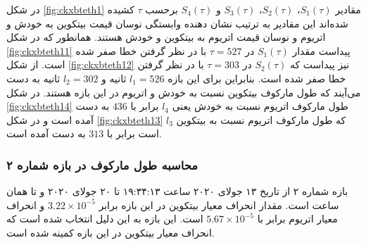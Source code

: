 در شکل \ref{fig:ckxbteth1} مقادیر $S_1( \tau )$، $S_2( \tau )$، $S_3( \tau )$ و $S_4( \tau )$ برحسب $\tau$ 
کشیده شده‌اند این مقادیر به ترتیب نشان دهنده وابستگی نوسان قیمت بیتکوین به خودش و اتریوم و نوسان قیمت اتریوم به بیتکوین و خودش هستند. 
همانطور که در شکل \ref{fig:ckxbteth11} پیداست مقدار $S_1( \tau )$ در $\tau = 527$ با در نظر گرفتن خطا 
صفر شده است. از شکل \ref{fig:ckxbteth12} نیز پیداست که $S_2( \tau )$ در $\tau = 303$ با در نظر گرفتن خطا صفر شده است. 
بنابراین برای این بازه $l_1 = 526$ ثانیه و $l_2 = 302$ ثانیه به دست می‌آیند که طول مارکوف بیتکوین نسبت به خودش و اتریوم در این بازه هستند. در شکل 
\ref{fig:ckxbteth14} طول مارکوف اتریوم نسبت به خودش یعنی $l_4$ برابر با $436$ به دست آمده است و 
در شکل \ref{fig:ckxbteth13} $l_3$ که طول مارکوف اتریوم نسبت به بیتکوین است برابر با $313$ به دست آمده است.


\subsubsection{محاسبه طول مارکوف در بازه شماره ۲}
بازه شماره ۲ از تاریخ ۱۳ جولای ۲۰۲۰ ساعت ۱۹:۳۴:۱۳ تا ۲۰ جولای ۲۰۲۰ و تا همان ساعت است. 
مقدار انحراف معیار بیتکوین در این بازه برابر $3.22 \times 10^{-5}$ و انحراف معیار اتریوم برابر با $5.67 \times 10^{-5}$ 
است. این بازه به این دلیل انتخاب شده ‌است که انحراف معیار بیتکوین در این بازه کمینه شده است.

